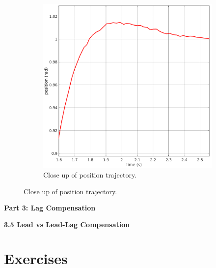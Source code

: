\documentclass[11pt,a4paper]{article}
\begin{document}
\begin{figure}[h!]
\begin{subfigure}{.5\textwidth}
		\includegraphics[width = \textwidth]{imglab/lab4sol_leadtrajverification.png}
		\caption{Close up of position trajectory.}	
	\end{subfigure}
\end{figure}

\textbf{Part 3: Lag Compensation}

\textbf{3.5 Lead vs Lead-Lag Compensation}


\section{Exercises}
\end{document}
